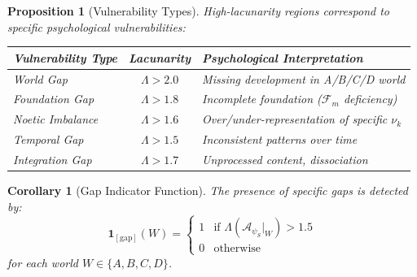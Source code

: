 \documentclass[11pt,twoside]{book}
\renewcommand{\arraystretch}{1.2}
\newcommand{\noe}[1]{\nu_{#1}}
\newcommand{\Foundations}{\mathcal{F}}
\newcommand{\Lacunarity}{\Lambda}
\newcommand{\PsychAttractor}{\mathcal{A}_\psi}
\newtheorem{proposition}{Proposition}[chapter]
\newtheorem{corollary}{Corollary}[chapter]
\begin{document}
\begin{proposition}[Vulnerability Types]
\label{prop:vuln-types}
High-lacunarity regions correspond to specific psychological vulnerabilities:

\begin{center}
\footnotesize
\renewcommand{\arraystretch}{1.2}
\begin{tabularx}{\textwidth}{l|c|X}
\toprule
\textbf{Vulnerability Type} & \textbf{Lacunarity} & \textbf{Psychological Interpretation} \\
\midrule
World Gap & $\Lacunarity > 2.0$ & Missing development in A/B/C/D world \\
Foundation Gap & $\Lacunarity > 1.8$ & Incomplete foundation ($\Foundations_m$ deficiency) \\
Noetic Imbalance & $\Lacunarity > 1.6$ & Over/under-representation of specific $\noe{k}$ \\
Temporal Gap & $\Lacunarity > 1.5$ & Inconsistent patterns over time \\
Integration Gap & $\Lacunarity > 1.7$ & Unprocessed content, dissociation \\
\bottomrule
\end{tabularx}
\end{center}
\end{proposition}

\begin{corollary}[Gap Indicator Function]
\label{cor:gap-indicator}
The presence of specific gaps is detected by:
\[
    \mathbf{1}_{[\mathrm{gap}]}(W) =
    \begin{cases}
        1 & \text{if } \Lacunarity(\PsychAttractor_S|_W) > 1.5 \\
        0 & \text{otherwise}
    \end{cases}
\]
for each world $W \in \{A, B, C, D\}$.
\end{corollary}
\end{document}
